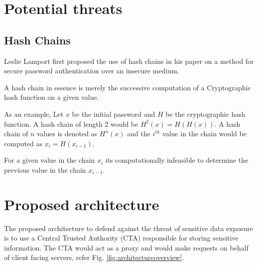 \documentclass{sig-alternate-05-2015}
\begin{document}
\section*{Potential threats}

\subsection{Hash Chains \cite{horne_hash_2011}}

Leslie Lamport \cite{lamport_password_1981} first proposed the use of hash chains in his paper on a method for secure password authentication over an insecure medium.


A hash chain in essence is merely the successive computation of a Cryptographic hash function on a given value. 

As an example, Let $x$ be the initial password and $H$ be the cryptographic hash function.  A hash chain of length 2 would be $H^{2}(x) = H(H(x))$. A hash chain of $n$ values is denoted as $H^{n}(x)$ and the $i^{th}$ value in the chain would be computed as $x_{i} = H(x_{i-1})$.

For a given value in the chain $x_{i}$ its computationally infeasible to determine the previous value in the chain $x_{i-1}$.


\section{Proposed architecture}

The proposed architecture to defend against the threat of sensitive data exposure is to use a Central Trusted Authority (CTA) responsible for storing sensitive information. The CTA would act as a proxy and would make requests on behalf of client facing servers, refer Fig. \ref{fig:architectureoverview}.
\end{document}
